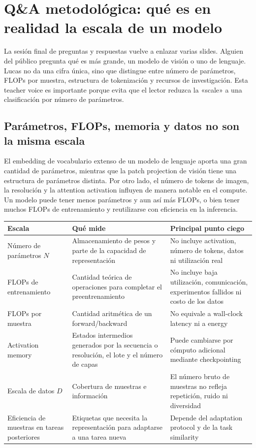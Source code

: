 \section{Q\&A metodológica: qué es en realidad la escala de un modelo}

La sesión final de preguntas y respuestas vuelve a enlazar varias slides. Alguien del público pregunta qué es más grande, un modelo de visión o uno de lenguaje. Lucas no da una cifra única, sino que distingue entre número de parámetros, FLOPs por muestra, estructura de tokenización y recursos de investigación. Esta teacher voice es importante porque evita que el lector reduzca la «scale» a una clasificación por número de parámetros.

\subsection{Parámetros, FLOPs, memoria y datos no son la misma escala}

El embedding de vocabulario extenso de un modelo de lenguaje aporta una gran cantidad de parámetros, mientras que la patch projection de visión tiene una estructura de parámetros distinta. Por otro lado, el número de tokens de imagen, la resolución y la attention activation influyen de manera notable en el compute. Un modelo puede tener menos parámetros y aun así más FLOPs, o bien tener muchos FLOPs de entrenamiento y reutilizarse con eficiencia en la inferencia.

\begin{longtable}{L{0.19\textwidth}L{0.31\textwidth}L{0.40\textwidth}}
\toprule
Escala & Qué mide & Principal punto ciego \\
\midrule
Número de parámetros $N$ & Almacenamiento de pesos y parte de la capacidad de representación & No incluye activation, número de tokens, datos ni utilización real \\
FLOPs de entrenamiento & Cantidad teórica de operaciones para completar el preentrenamiento & No incluye baja utilización, comunicación, experimentos fallidos ni costo de los datos \\
FLOPs por muestra & Cantidad aritmética de un forward/backward & No equivale a wall-clock latency ni a energy \\
Activation memory & Estados intermedios generados por la secuencia o resolución, el lote y el número de capas & Puede cambiarse por cómputo adicional mediante checkpointing \\
Escala de datos $D$ & Cobertura de muestras e información & El número bruto de muestras no refleja repetición, ruido ni diversidad \\
Eficiencia de muestras en tareas posteriores & Etiquetas que necesita la representación para adaptarse a una tarea nueva & Depende del adaptation protocol y de la task similarity \\
\bottomrule
\end{longtable}

